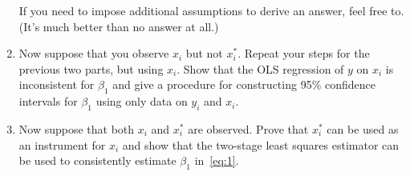 \begin{hw}
\begin{enumerate}
    If you need to impose additional assumptions to derive an answer,
    feel free to. (It's much better than no answer at all.)

  \item Now suppose that you observe $x_i$ but not $x_i^*$.  Repeat
    your steps for the previous two parts, but using $x_i$.  Show that
    the OLS regression of $y$ on $x_i$ is inconsistent for $\beta_1$
    and give a procedure for constructing 95\% confidence intervals
    for $\beta_1$ using only data on $y_i$ and $x_i$.

  \item Now suppose that both $x_i$ and $x_i^*$ are observed. Prove
    that $x_i^*$ can be used as an instrument for $x_i$ and show that
    the two-stage least squares estimator can be used to consistently
    estimate $\beta_1$ in~\eqref{eq:1}.

  \end{enumerate}

\end{hw}

